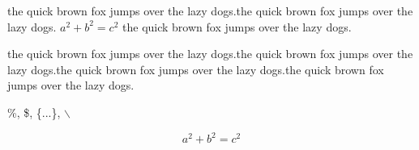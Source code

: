 \documentclass{article}
\begin{document}
	the quick brown fox jumps over the lazy dogs.the quick brown fox jumps over the lazy dogs. $a^2+b^2=c^2$ the quick brown fox jumps over the lazy dogs.
	
	the quick brown fox jumps over the lazy dogs.the quick brown fox jumps over the lazy dogs.the quick brown fox jumps over the lazy dogs.the quick brown fox jumps over the lazy dogs.
	
		\%, \$, \{...\}, $\backslash$
		
		$$a^2+b^2=c^2$$
\end{document}
